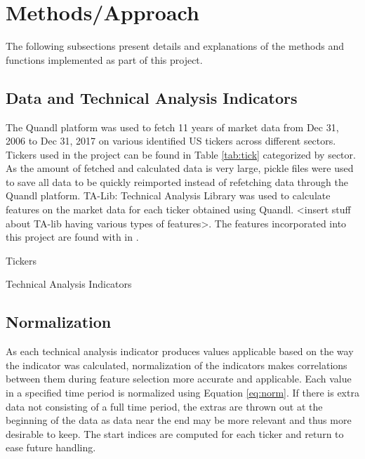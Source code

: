 \documentclass{article}
\begin{document}
\section{Methods/Approach}
The following subsections present details and explanations of the methods and functions implemented as part of this project.

\subsection{Data and Technical Analysis Indicators}
The Quandl platform was used to fetch 11 years of market data from Dec 31, 2006 to Dec 31, 2017 on various identified US tickers across different sectors. Tickers used in the project can be found in Table \ref{tab:tick} categorized by sector. As the amount of fetched and calculated data is very large, pickle files were used to save all data to be quickly reimported instead of refetching data through the Quandl platform. TA-Lib: Technical Analysis Library was used to calculate features on the market data for each ticker obtained using Quandl. <insert stuff about TA-lib having various types of features>. The features incorporated into this project are found with in .

\begin{table}[h]
	\centering
	\caption{Tickers}
	\label{tab:tick}
\end{table}

\begin{table}[h]
	\caption{Technical Analysis Indicators}
	\label{tab:inds}
\end{table}

\subsection{Normalization}
As each technical analysis indicator produces values applicable based on the way the indicator was calculated, normalization of the indicators makes correlations between them during feature selection more accurate and applicable. Each value in a specified time period is normalized using Equation \eqref{eq:norm}. If there is extra data not consisting of a full time period, the extras are thrown out at the beginning of the data as data near the end may be more relevant and thus more desirable to keep. The start indices are computed for each ticker and return to ease future handling.
\end{document}
